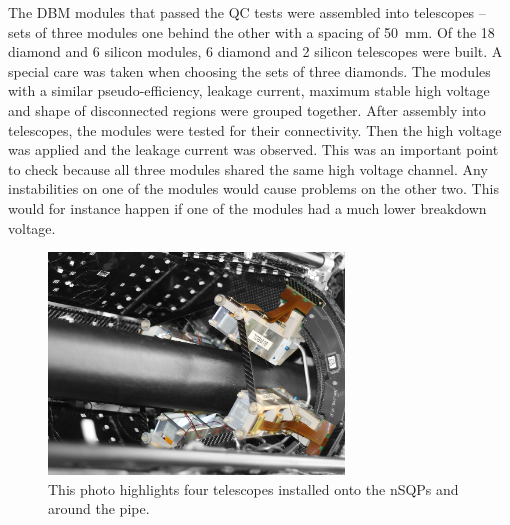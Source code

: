 The DBM modules that passed the QC tests were assembled into telescopes -- sets of three modules one behind the other with a spacing of 50~mm. Of the 18 diamond and 6 silicon modules, 6 diamond and 2 silicon telescopes were built. A special care was taken when choosing the sets of three diamonds. The modules with a similar pseudo-efficiency, leakage current, maximum stable high voltage and shape of disconnected regions were grouped together. After assembly into telescopes, the modules were tested for their connectivity. Then the high voltage was applied and the leakage current was observed. This was an important point to check because all three modules shared the same high voltage channel. Any instabilities on one of the modules would cause problems on the other two. This would for instance happen if one of the modules had a much lower breakdown voltage.
\begin{figure}[!t]
\centering
\includegraphics[width=0.7\textwidth]{04_charge_monitoring/pics/DBM-installed-colour1}
\caption{This photo highlights four telescopes installed onto the nSQPs and around the pipe.}
\label{fig:dbminatlas}
\end{figure}
